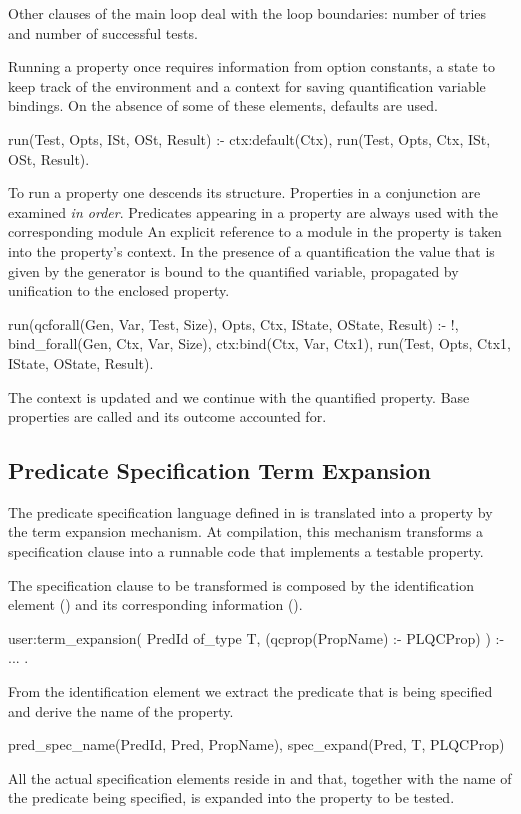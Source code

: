 %
Other clauses of the main loop deal with the loop boundaries: number of
tries and number of successful tests.


Running a property once requires information from option constants, a state to
keep track of the environment and a context for saving quantification
variable bindings.
%
On the absence of some of these elements, defaults are used.
%
\begin{yapcode}
 run(Test, Opts, ISt, OSt, Result) :-
   ctx:default(Ctx),
   run(Test, Opts, Ctx, ISt, OSt, Result).
\end{yapcode}


To run a property one descends its structure.
%
Properties in a conjunction are examined \emph{in order}.
%
Predicates appearing in a property are always used with the
corresponding module
%
An explicit reference to a module in the property is taken into the
property's context.
%
In the presence of a \plqc{} quantification the value that is given by
the generator is bound to the quantified variable, propagated by
unification to the enclosed property.
%
\begin{yapcode}
 run(qcforall(Gen, Var, Test, Size),
     Opts, Ctx, IState, OState, Result) :- 
   !, bind_forall(Gen, Ctx, Var, Size),
   ctx:bind(Ctx, Var, Ctx1),
   run(Test, Opts, Ctx1,
       IState, OState, Result).
\end{yapcode}
The context is updated and we continue with the quantified property.
%
Base properties are called and its outcome accounted for.
%


\subsection{Predicate Specification Term Expansion}

The predicate specification language defined in \plqc{} is
translated into a \plqc{} property by the term expansion mechanism.
%
At compilation, this mechanism transforms a specification clause into
a runnable code that implements a testable property.


The specification clause to be transformed is composed by the
identification element () and its corresponding
information ().
%
\begin{yapcode}
 user:term_expansion(
       PredId of_type T,
       (qcprop(PropName) :- PLQCProp) ) :-
   ...
 .
\end{yapcode}
%
From the identification element we extract the predicate that is being
specified and derive the name of the property.
%
\begin{yapcode}
   pred_spec_name(PredId, Pred, PropName),
   spec_expand(Pred, T, PLQCProp)
\end{yapcode}
%
All the actual specification elements reside in  and that,
together with the name of the predicate being specified, is expanded
into the property to be tested.


